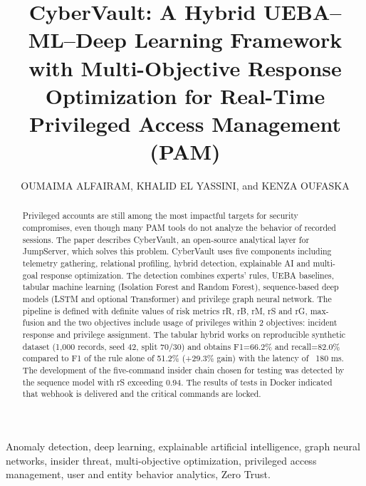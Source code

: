 \documentclass{ieeeaccess}
\begin{document}


\title{CyberVault: A Hybrid UEBA--ML--Deep Learning Framework with Multi-Objective Response Optimization for Real-Time Privileged Access Management (PAM)}

\author{\uppercase{Oumaima Alfairam},
\uppercase{Khalid El Yassini},
and \uppercase{Kenza Oufaska}}

\address[1]{IAOR Research Team, IA Laboratory, Moulay Ismail University, Meknes, Morocco}
\address[2]{LERMA Laboratory, International University of Rabat, Morocco}



\begin{abstract}
Privileged accounts are still among the most impactful targets for security compromises, even though many PAM tools do not analyze the behavior of recorded sessions. The paper describes CyberVault, an open-source analytical layer for JumpServer, which solves this problem. CyberVault uses five components including telemetry gathering, relational profiling, hybrid detection, explainable AI and multi-goal response optimization. The detection combines experts’ rules, UEBA baselines, tabular machine learning (Isolation Forest and Random Forest), sequence-based deep models (LSTM and optional Transformer) and privilege graph neural network. The pipeline is defined with definite values of risk metrics rR, rB, rM, rS and rG, max-fusion and the two objectives include usage of privileges within 2 objectives: incident response and privilege assignment. The tabular hybrid works on reproducible synthetic dataset (1,000 records, seed 42, split 70/30) and obtains F1=66.2\% and recall=82.0\% compared to F1 of the rule alone of 51.2\% (+29.3\% gain) with the latency of ~180 ms. The development of the five-command insider chain chosen for testing was detected by the sequence model with rS exceeding 0.94. The results of tests in Docker indicated that webhook is delivered and the critical commands are locked.

\end{abstract}

\begin{keywords}
Anomaly detection, deep learning, explainable artificial intelligence, graph neural networks, insider threat, multi-objective optimization, privileged access management, user and entity behavior analytics, Zero Trust.
\end{keywords}
\end{document}
